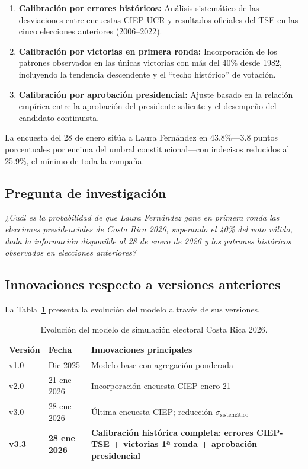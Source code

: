 \documentclass[11pt,a4paper]{article}
\begin{document}
\begin{enumerate}[label=(\arabic*)]
    \item \textbf{Calibración por errores históricos:} Análisis sistemático de las desviaciones entre encuestas CIEP-UCR y resultados oficiales del TSE en las cinco elecciones anteriores (2006--2022).
    
    \item \textbf{Calibración por victorias en primera ronda:} Incorporación de los patrones observados en las únicas victorias con más del 40\% desde 1982, incluyendo la tendencia descendente y el ``techo histórico'' de votación.
    
    \item \textbf{Calibración por aprobación presidencial:} Ajuste basado en la relación empírica entre la aprobación del presidente saliente y el desempeño del candidato continuista.
\end{enumerate}

La encuesta del 28 de enero sitúa a Laura Fernández en 43.8\%---3.8 puntos porcentuales por encima del umbral constitucional---con indecisos reducidos al 25.9\%, el mínimo de toda la campaña.

\subsection{Pregunta de investigación}

\textit{¿Cuál es la probabilidad de que Laura Fernández gane en primera ronda las elecciones presidenciales de Costa Rica 2026, superando el 40\% del voto válido, dada la información disponible al 28 de enero de 2026 y los patrones históricos observados en elecciones anteriores?}

\subsection{Innovaciones respecto a versiones anteriores}

La Tabla~\ref{tab:versiones} presenta la evolución del modelo a través de sus versiones.

\begin{table}[H]
\centering
\caption{Evolución del modelo de simulación electoral Costa Rica 2026.}
\label{tab:versiones}
\begin{tabular}{@{}llp{8cm}@{}}
\toprule
\textbf{Versión} & \textbf{Fecha} & \textbf{Innovaciones principales} \\
\midrule
v1.0 & Dic 2025 & Modelo base con agregación ponderada \\
v2.0 & 21 ene 2026 & Incorporación encuesta CIEP enero 21 \\
v3.0 & 28 ene 2026 & Última encuesta CIEP; reducción $\sigma_{\text{sistemático}}$ \\
\textbf{v3.3} & \textbf{28 ene 2026} & \textbf{Calibración histórica completa: errores CIEP-TSE + victorias 1ª ronda + aprobación presidencial} \\
\bottomrule
\end{tabular}
\end{table}
\end{document}
